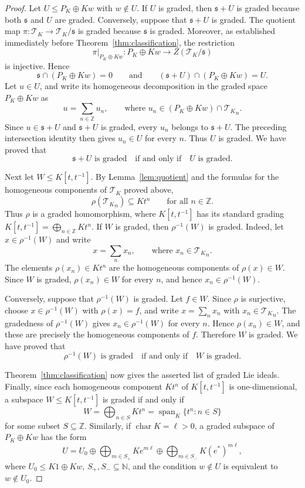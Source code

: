 \documentclass[11pt]{article}
\numberwithin{equation}{section}
\theoremstyle{plain}
\theoremstyle{definition}
\numberwithin{equation}{section}
\newcommand{\T}{\mathscr T_K}
\begin{document}
\begin{proof}
Let $U\leq P_K\oplus Kw$ with $w\notin U$. If $U$ is graded, then $\mathfrak s+U$ is graded because both $\mathfrak s$ and $U$ are graded. Conversely, suppose that $\mathfrak s+U$ is graded. The quotient map $\pi:\T\to\T/\mathfrak s$ is graded because $\mathfrak s$ is graded. Moreover, as established immediately before Theorem~\ref{thm:classification}, the restriction
$$
\pi|_{P_K\oplus Kw}:P_K\oplus Kw\longrightarrow Z(\T/\mathfrak s)
$$
is injective. Hence
$$
\mathfrak s\cap(P_K\oplus Kw)=0
\qquad\text{and}\qquad
(\mathfrak s+U)\cap(P_K\oplus Kw)=U.
$$
Let $u\in U$, and write its homogeneous decomposition in the graded space $P_K\oplus Kw$ as
$$
u=\sum_{n\in\mathbb Z}u_n,\qquad\text{where } u_n\in(P_K\oplus Kw)\cap{\T}_n.
$$
Since $u\in\mathfrak s+U$ and $\mathfrak s+U$ is graded, every $u_n$ belongs to $\mathfrak s+U$. The preceding intersection identity then gives $u_n\in U$ for every $n$. Thus $U$ is graded. We have proved that
$$
\mathfrak s+U\text{ is graded}
\quad\text{if and only if}\quad
U\text{ is graded}.
$$

Next let $W\leq K[t,t^{-1}]$. By Lemma~\ref{lem:quotient} and the formulas for the homogeneous components of $\T$ proved above,
$$
\rho({\T}_n)\subseteq Kt^n\qquad\text{for all }n\in\mathbb Z.
$$
Thus $\rho$ is a graded homomorphism, where $K[t,t^{-1}]$ has its standard grading $K[t,t^{-1}]=\bigoplus_{n\in\mathbb Z}Kt^n$. If $W$ is graded, then $\rho^{-1}(W)$ is graded. Indeed, let $x\in\rho^{-1}(W)$ and write
$$
x=\sum_n x_n,\qquad\text{where } x_n\in{\T}_n.
$$
The elements $\rho(x_n)\in Kt^n$ are the homogeneous components of $\rho(x)\in W$. Since $W$ is graded, $\rho(x_n)\in W$ for every $n$, and hence $x_n\in\rho^{-1}(W)$.

Conversely, suppose that $\rho^{-1}(W)$ is graded. Let $f\in W$. Since $\rho$ is surjective, choose $x\in\rho^{-1}(W)$ with $\rho(x)=f$, and write $x=\sum_nx_n$ with $x_n\in{\T}_n$. The gradedness of $\rho^{-1}(W)$ gives $x_n\in\rho^{-1}(W)$ for every $n$. Hence $\rho(x_n)\in W$, and these are precisely the homogeneous components of $f$. Therefore $W$ is graded. We have proved that
$$
\rho^{-1}(W)\text{ is graded}
\quad\text{if and only if}\quad
W\text{ is graded}.
$$

Theorem~\ref{thm:classification} now gives the asserted list of graded Lie ideals. Finally, since each homogeneous component $Kt^n$ of $K[t,t^{-1}]$ is one-dimensional, a subspace $W\leq K[t,t^{-1}]$ is graded if and only if
$$
W=\bigoplus_{n\in S}Kt^n
=\operatorname{span}_K\{t^n:n\in S\}
$$
for some subset $S\subseteq\mathbb Z$. Similarly, if $\operatorname{char}K=\ell>0$, a graded subspace of $P_K\oplus Kw$ has the form
$$
U=U_0
\oplus\bigoplus_{m\in S_+}Ke^{m\ell}
\oplus\bigoplus_{m\in S_-}K(e^*)^{m\ell},
$$
where $U_0\leq K1\oplus Kw$, $S_+,S_-\subseteq\mathbb N$, and the condition $w\notin U$ is equivalent to $w\notin U_0$.
\end{proof}
\end{document}
